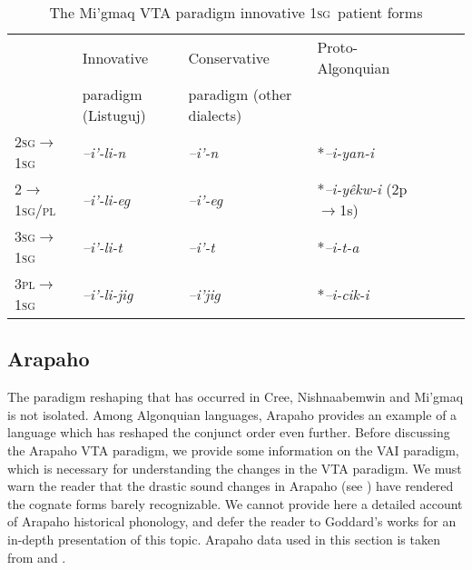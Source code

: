 \documentclass[twoside,a4paper,11pt]{article}
\newcommand{\ipa}[1]{{\phon\textit{#1}}}
\newcommand{\sg}{\textsc{sg}}
\newcommand{\pl}{\textsc{pl}}
\newcommand{\grise}[1]{\cellcolor{lightgray}\textbf{#1}}
\begin{document}
\begin{table}[H]
\caption{The Mi'gmaq VTA paradigm innovative 1\sg\ patient forms}
\centering \label{tab:migmaq.vta.innov.1s}
\begin{tabular}{lllllll}
\toprule
& Innovative & Conservative & Proto-Algonquian \\
&paradigm (Listuguj) & paradigm (other dialects) &\\
\midrule
2\sg$\rightarrow$1\sg &\ipa{--i'-li-n} \grise{}& 	\ipa{--i'-n} & *\ipa{--i-yan-i}\\
2$\rightarrow$1\sg/\pl &\ipa{--i'-li-eg} \grise{}& 	\ipa{--i'-eg} & *\ipa{--i-yêkw-i} (2p$\rightarrow$1s)\\
\midrule
3\sg$\rightarrow$1\sg & 	\ipa{--i'-li-t} \grise{}& 	\ipa{--i'-t} &  *\ipa{--i-t-a} \\
3\pl$\rightarrow$1\sg & 	\ipa{--i'-li-jig} \grise{}& 	\ipa{--i'jig}  &*\ipa{--i-cik-i} \\
\bottomrule
\end{tabular}
\end{table}


\subsection{Arapaho}

The paradigm reshaping that has occurred in Cree, Nishnaabemwin and Mi'gmaq is not isolated. Among Algonquian languages, Arapaho provides an example of a language which has reshaped the conjunct order even further. Before discussing the Arapaho VTA paradigm, we provide some information on the VAI   paradigm, which is necessary for understanding the changes in the VTA paradigm. %
We must warn the reader that the drastic sound changes in Arapaho (see \citealt{goddard74arapaho}) have rendered the cognate forms barely recognizable. We cannot provide here a detailed account of Arapaho historical phonology, and defer the reader to Goddard's works for an in-depth presentation of this topic. Arapaho data used in this section is taken from \citet{salzmann67arapaho.verb} and \citet{cowell06arapaho}.
\end{document}
